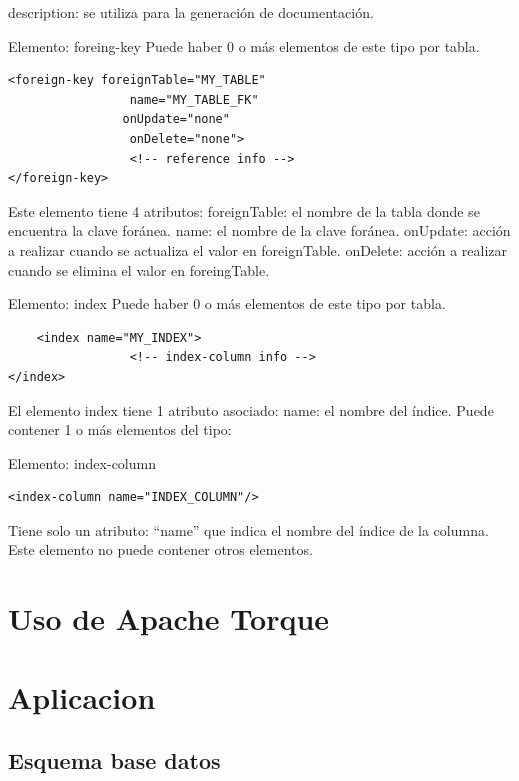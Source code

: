 \documentclass[12pt, oneside]{article}
\begin{document}
description: se utiliza para la generación de documentación.


Elemento: foreing-key
Puede haber 0 o más elementos de este tipo por tabla.

\begin{lstlisting}
<foreign-key foreignTable="MY_TABLE"
         		 name="MY_TABLE_FK"
          		onUpdate="none"
         		 onDelete="none">
         		 <!-- reference info -->
</foreign-key>
\end{lstlisting}

Este elemento tiene 4 atributos:
foreignTable: el nombre de la tabla donde se encuentra la clave foránea.
name: el nombre de la clave foránea.
onUpdate: acción a realizar cuando se actualiza el valor en foreignTable.
onDelete: acción a realizar cuando se elimina el valor en foreingTable.

Elemento: index
Puede haber 0 o más elementos de este tipo por tabla.

\begin{lstlisting}
	<index name="MY_INDEX">
         		 <!-- index-column info -->
</index>
\end{lstlisting}

El elemento index tiene 1 atributo asociado:
name: el nombre del índice. 
Puede contener 1 o más elementos  del tipo:
	
Elemento: index-column

\begin{lstlisting}
<index-column name="INDEX_COLUMN"/>
\end{lstlisting}

Tiene solo un atributo: “name” que indica el nombre del índice de la columna. Este elemento no puede contener otros elementos.


\section{Uso de Apache Torque}

\section{Aplicacion}
\subsection{Esquema base datos}

\end{document}
